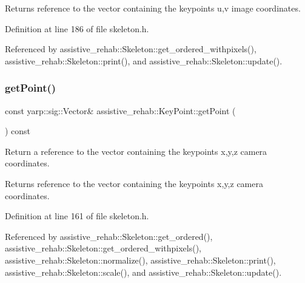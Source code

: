 \begin{DoxyReturn}{Returns}
reference to the vector containing the keypoint\textquotesingle{}s u,v image coordinates. 
\end{DoxyReturn}


Definition at line 186 of file skeleton.\+h.


\begin{DoxyCode}{0}

\end{DoxyCode}


Referenced by assistive\+\_\+rehab\+::\+Skeleton\+::get\+\_\+ordered\+\_\+withpixels(), assistive\+\_\+rehab\+::\+Skeleton\+::print(), and assistive\+\_\+rehab\+::\+Skeleton\+::update().

\mbox{\label{classassistive__rehab_1_1KeyPoint_a4d68e0824d66f6f0db6dbc176eec3930}} 
\subsubsection{\texorpdfstring{getPoint()}{getPoint()}}
{\footnotesize\ttfamily const yarp\+::sig\+::\+Vector\& assistive\+\_\+rehab\+::\+Key\+Point\+::get\+Point (\begin{DoxyParamCaption}{ }\end{DoxyParamCaption}) const\hspace{0.3cm}{\ttfamily [inline]}}



Return a reference to the vector containing the keypoint\textquotesingle{}s x,y,z camera coordinates. 

\begin{DoxyReturn}{Returns}
reference to the vector containing the keypoint\textquotesingle{}s x,y,z camera coordinates. 
\end{DoxyReturn}


Definition at line 161 of file skeleton.\+h.


\begin{DoxyCode}{0}

\end{DoxyCode}


Referenced by assistive\+\_\+rehab\+::\+Skeleton\+::get\+\_\+ordered(), assistive\+\_\+rehab\+::\+Skeleton\+::get\+\_\+ordered\+\_\+withpixels(), assistive\+\_\+rehab\+::\+Skeleton\+::normalize(), assistive\+\_\+rehab\+::\+Skeleton\+::print(), assistive\+\_\+rehab\+::\+Skeleton\+::scale(), and assistive\+\_\+rehab\+::\+Skeleton\+::update().

